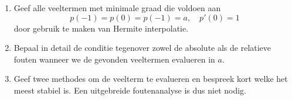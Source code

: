 \documentclass[kulak]{kulakarticle}
\begin{document}
	\begin{enumerate}

		\item Geef alle veeltermen met minimale graad die voldoen aan \[p(-1)=p(0)=p(-1)=a, \quad p'(0)=1\] door gebruik te maken van Hermite interpolatie.

		\item Bepaal in detail de conditie tegenover zowel de absolute als de relatieve fouten wanneer we de gevonden veeltermen evalueren in \(a\).

		\item Geef twee methodes om de veelterm te evalueren en bespreek kort welke het meest stabiel is. Een uitgebreide foutenanalyse is dus niet nodig.

	\end{enumerate}
\end{document}
